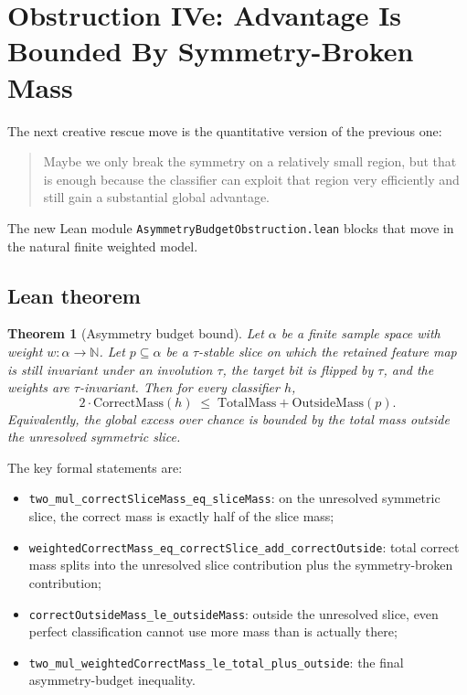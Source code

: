 \documentclass[11pt]{article}
\newtheorem{theorem}{Theorem}[section]
\theoremstyle{remark}
\begin{document}
\section{Obstruction IVe: Advantage Is Bounded By Symmetry-Broken Mass}

The next creative rescue move is the quantitative version of the previous one:
\begin{quote}
Maybe we only break the symmetry on a relatively small region, but that is enough because the
classifier can exploit that region very efficiently and still gain a substantial global advantage.
\end{quote}

The new Lean module \texttt{AsymmetryBudgetObstruction.lean} blocks that move in the natural
finite weighted model.

\subsection{Lean theorem}

\begin{theorem}[Asymmetry budget bound]
Let \(\alpha\) be a finite sample space with weight \(w : \alpha \to \mathbb{N}\).  Let
\(p \subseteq \alpha\) be a \(\tau\)-stable slice on which the retained feature map is still
invariant under an involution \(\tau\), the target bit is flipped by \(\tau\), and the weights are
\(\tau\)-invariant.  Then for every classifier \(h\),
\[
  2 \cdot \mathrm{CorrectMass}(h)
  \;\le\;
  \mathrm{TotalMass} + \mathrm{OutsideMass}(p).
\]
Equivalently, the global excess over chance is bounded by the total mass outside the unresolved
symmetric slice.
\end{theorem}

\noindent
The key formal statements are:
\begin{itemize}[leftmargin=1.5em]
  \item \texttt{two\_mul\_correctSliceMass\_eq\_sliceMass}: on the unresolved symmetric slice, the
  correct mass is exactly half of the slice mass;
  \item \texttt{weightedCorrectMass\_eq\_correctSlice\_add\_correctOutside}: total correct mass
  splits into the unresolved slice contribution plus the symmetry-broken contribution;
  \item \texttt{correctOutsideMass\_le\_outsideMass}: outside the unresolved slice, even perfect
  classification cannot use more mass than is actually there;
  \item \texttt{two\_mul\_weightedCorrectMass\_le\_total\_plus\_outside}: the final asymmetry-budget
  inequality.
\end{itemize}
\end{document}
